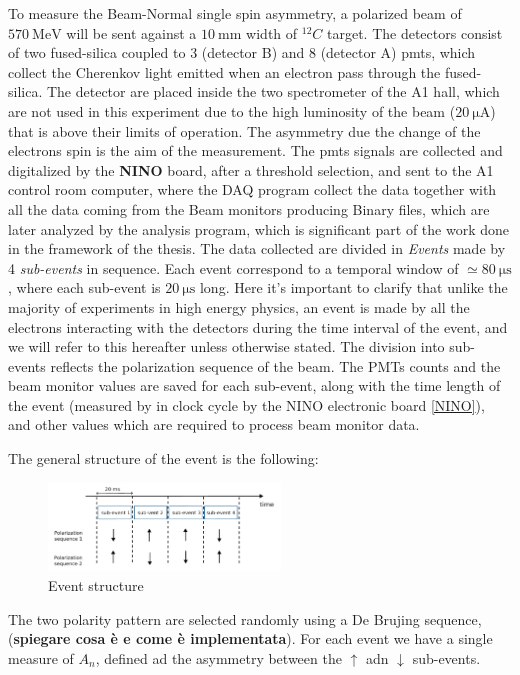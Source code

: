 To measure the Beam-Normal single spin asymmetry, a polarized beam of $ \SI{570}{\mega \electronvolt}$ will be sent against a $\SI{10}{\milli \meter}$ width of $^{12}C$ target. The detectors consist of two fused-silica coupled to 3 (detector B) and 8 (detector A) pmts, which collect the Cherenkov light emitted when an electron pass through the fused-silica. 
The detector are placed inside the two spectrometer of the A1 hall, which are not used in this experiment due to the high luminosity of the beam ($ \SI{20}{\micro \ampere}$) that is above their limits of operation. 
The asymmetry due the change of the electrons spin is the aim of the measurement. The pmts signals are collected and digitalized by the \textbf{NINO} board, after a threshold selection, and sent to the A1 control room computer, where the DAQ program collect the data together with all the data coming from the Beam monitors producing Binary files, which are later analyzed by the analysis program, which is significant part of the work done in the framework of the thesis. 
The data collected are divided in \textit{Events} made by 4 \textit{sub-events} in sequence. Each event correspond to a temporal window of $\simeq \SI{80}{\micro \second}$, where each sub-event is $\SI{20}{\micro \second}$ long. Here it's important to clarify that unlike the majority of experiments in high energy physics, an event is made by all the electrons interacting with the detectors during the time interval of the event, and we will refer to this hereafter unless otherwise stated. The division into sub-events reflects the polarization sequence of the beam. The PMTs counts and the beam monitor values are saved for each sub-event, along with the time length of the event (measured by in clock cycle by the NINO electronic board \ref{NINO}), and other values which are required to process beam monitor data.

The general structure of the event is the following: 

\begin{figure}[hbtp]
\centering
\includegraphics[width = 0.55\textwidth]{ExperimentalSetup/EventStructure.pdf}
\caption{Event structure}
\end{figure}

The two polarity pattern are selected randomly using a De Brujing sequence, (\textbf{spiegare cosa è e come è implementata}). For each event we have a single measure of $A_{n}$, defined ad the asymmetry between the $\uparrow$ adn $\downarrow$ sub-events.

